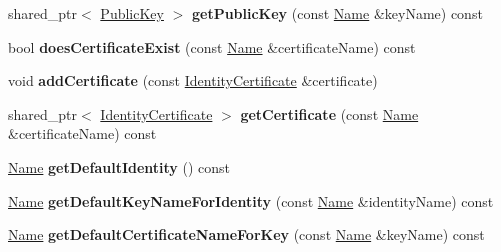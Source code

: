 \begin{DoxyCompactItemize}
\item 
shared\+\_\+ptr$<$ \hyperlink{classndn_1_1PublicKey}{Public\+Key} $>$ {\bfseries get\+Public\+Key} (const \hyperlink{classndn_1_1Name}{Name} \&key\+Name) const\hypertarget{classndn_1_1security_1_1KeyChain_a2a3d7e885c3ab7b806450bd4a9be60da}{}\label{classndn_1_1security_1_1KeyChain_a2a3d7e885c3ab7b806450bd4a9be60da}

\item 
bool {\bfseries does\+Certificate\+Exist} (const \hyperlink{classndn_1_1Name}{Name} \&certificate\+Name) const\hypertarget{classndn_1_1security_1_1KeyChain_a3308c61c4c28bb14c6f0a7d3fec52636}{}\label{classndn_1_1security_1_1KeyChain_a3308c61c4c28bb14c6f0a7d3fec52636}

\item 
void {\bfseries add\+Certificate} (const \hyperlink{classndn_1_1IdentityCertificate}{Identity\+Certificate} \&certificate)\hypertarget{classndn_1_1security_1_1KeyChain_a5f22ef6c28437b4456a872a3c389a043}{}\label{classndn_1_1security_1_1KeyChain_a5f22ef6c28437b4456a872a3c389a043}

\item 
shared\+\_\+ptr$<$ \hyperlink{classndn_1_1IdentityCertificate}{Identity\+Certificate} $>$ {\bfseries get\+Certificate} (const \hyperlink{classndn_1_1Name}{Name} \&certificate\+Name) const\hypertarget{classndn_1_1security_1_1KeyChain_aead1c533e9788fe163bb5bed8f9024ab}{}\label{classndn_1_1security_1_1KeyChain_aead1c533e9788fe163bb5bed8f9024ab}

\item 
\hyperlink{classndn_1_1Name}{Name} {\bfseries get\+Default\+Identity} () const\hypertarget{classndn_1_1security_1_1KeyChain_afe70c758680d45c92ed0ec9833a042a3}{}\label{classndn_1_1security_1_1KeyChain_afe70c758680d45c92ed0ec9833a042a3}

\item 
\hyperlink{classndn_1_1Name}{Name} {\bfseries get\+Default\+Key\+Name\+For\+Identity} (const \hyperlink{classndn_1_1Name}{Name} \&identity\+Name) const\hypertarget{classndn_1_1security_1_1KeyChain_a1d03373d90b9512bfca9613d28e44bd3}{}\label{classndn_1_1security_1_1KeyChain_a1d03373d90b9512bfca9613d28e44bd3}

\item 
\hyperlink{classndn_1_1Name}{Name} {\bfseries get\+Default\+Certificate\+Name\+For\+Key} (const \hyperlink{classndn_1_1Name}{Name} \&key\+Name) const\hypertarget{classndn_1_1security_1_1KeyChain_a3b1ff55f751243d23d7f428f9a0bfc24}{}\label{classndn_1_1security_1_1KeyChain_a3b1ff55f751243d23d7f428f9a0bfc24}


\end{DoxyCompactItemize}
